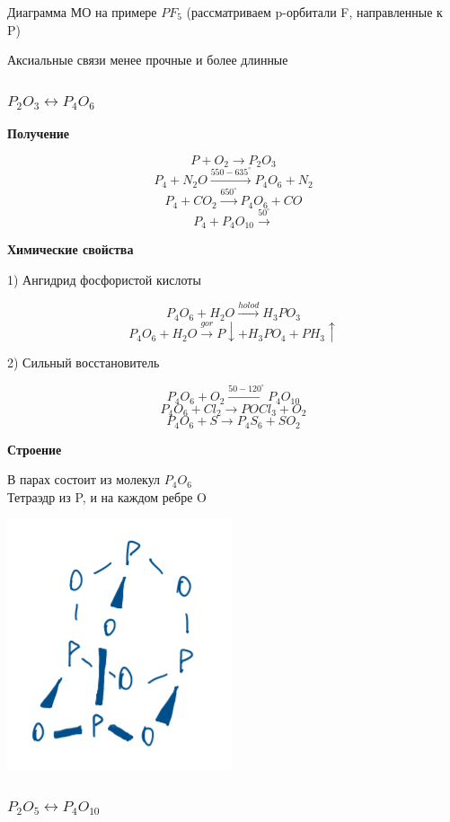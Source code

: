 Диаграмма МО на примере $PF_5$ (рассматриваем p-орбитали F, направленные к P)


Аксиальные связи менее прочные и более длинные

\subsubsection*{$P_2O_3 \leftrightarrow P_4O_6$}

\textbf{Получение}

$$P + O_2 \rightarrow P_2O_3$$
$$P_4 + N_2O \xrightarrow{550-635^{\circ}} P_4O_6 + N_2$$
$$P_4 + CO_2 \xrightarrow{650^{\circ}} P_4O_6 + CO$$
$$P_4 + P_4O_{10} \xrightarrow{50^{\circ}}$$

\textbf{Химические свойства}

1) Ангидрид фосфористой кислоты

$$P_4O_6 + H_2O \xrightarrow{holod} H_3PO_3$$
$$P_4O_6 + H_2O \xrightarrow{gor} P\downarrow + H_3PO_4 + PH_3\uparrow$$

2) Сильный восстановитель

$$P_4O_6 + O_2 \xrightarrow{50-120^{\circ}} P_4O_10$$
$$P_4O_6 + Cl_2  \rightarrow POCl_3 + O_2$$
$$P_4O_6 + S \rightarrow P_4S_6 + SO_2$$

\textbf{Строение}

В парах состоит из молекул $P_4O_6$\\
Тетраэдр из P, и на каждом ребре O

\includegraphics{images/9v5.png}

\subsubsection*{$P_2O_5 \leftrightarrow P_4O_{10}$}

